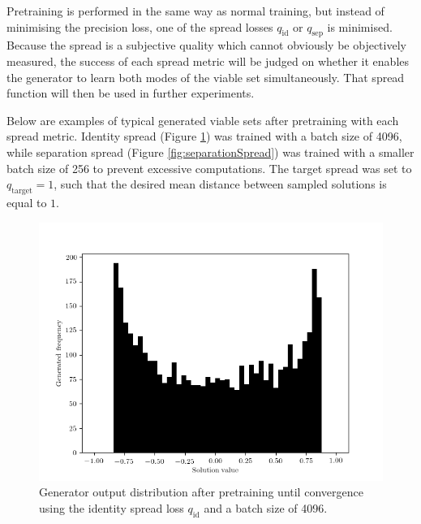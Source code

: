 \documentclass[../../main.tex]{subfiles}
\begin{document}
Pretraining is performed in the same way as normal training, but instead of minimising the precision loss, one of the spread losses $q_\text{id}$ or $q_\text{sep}$ is minimised.
Because the spread is a subjective quality which cannot obviously be objectively measured, the success of each spread metric will be judged on whether it enables the generator to learn both modes of the viable set simultaneously.
That spread function will then be used in further experiments.

Below are examples of typical generated viable sets after pretraining with each spread metric.
Identity spread (Figure \ref{fig:identitySpread}) was trained with a batch size of 4096, while separation spread (Figure \ref{fig:separationSpread}) was trained with a smaller batch size of 256 to prevent excessive computations.
The target spread was set to $q_\text{target} = 1$, such that the desired mean distance between sampled solutions is equal to $1$.
\begin{figure}[H]
    \begin{center}
    \includegraphics[width=\textwidth]{identitySpread}
    \caption{
        Generator output distribution after pretraining until convergence using the identity spread loss $q_\text{id}$ and a batch size of 4096.
    }
    \label{fig:identitySpread}
    \end{center}
\end{figure}
\end{document}
